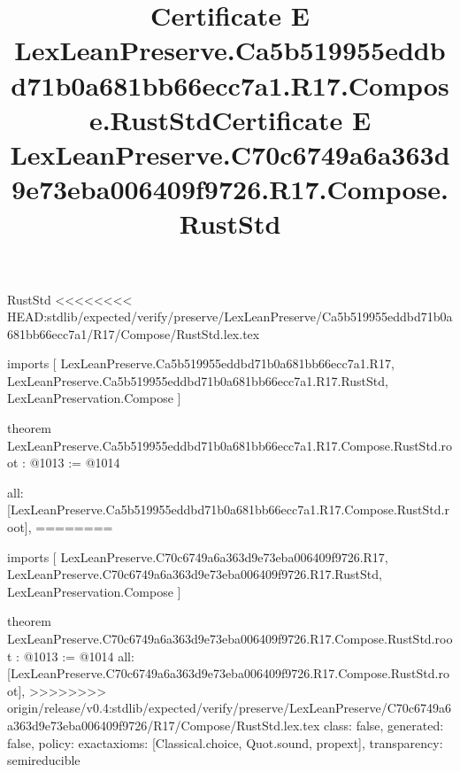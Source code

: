 \begin{lexlean}{RustStd}
<<<<<<<< HEAD:stdlib/expected/verify/preserve/LexLeanPreserve/Ca5b519955eddbd71b0a681bb66ecc7a1/R17/Compose/RustStd.lex.tex
\title{Certificate E LexLeanPreserve.Ca5b519955eddbd71b0a681bb66ecc7a1.R17.Compose.RustStd}
\begin{coremodule}
imports [
  LexLeanPreserve.Ca5b519955eddbd71b0a681bb66ecc7a1.R17,
  LexLeanPreserve.Ca5b519955eddbd71b0a681bb66ecc7a1.R17.RustStd,
  LexLeanPreservation.Compose
]

theorem LexLeanPreserve.Ca5b519955eddbd71b0a681bb66ecc7a1.R17.Compose.RustStd.root : @1013 := @1014 {
  all: [LexLeanPreserve.Ca5b519955eddbd71b0a681bb66ecc7a1.R17.Compose.RustStd.root],
========
\title{Certificate E LexLeanPreserve.C70c6749a6a363d9e73eba006409f9726.R17.Compose.RustStd}
\begin{coremodule}
imports [
  LexLeanPreserve.C70c6749a6a363d9e73eba006409f9726.R17,
  LexLeanPreserve.C70c6749a6a363d9e73eba006409f9726.R17.RustStd,
  LexLeanPreservation.Compose
]

theorem LexLeanPreserve.C70c6749a6a363d9e73eba006409f9726.R17.Compose.RustStd.root : @1013 := @1014 {
  all: [LexLeanPreserve.C70c6749a6a363d9e73eba006409f9726.R17.Compose.RustStd.root],
>>>>>>>> origin/release/v0.4:stdlib/expected/verify/preserve/LexLeanPreserve/C70c6749a6a363d9e73eba006409f9726/R17/Compose/RustStd.lex.tex
  class: false,
  generated: false,
  policy: exact{axioms: [Classical.choice, Quot.sound, propext]},
  transparency: semireducible
}


\end{coremodule}}
\end{coremodule}
\end{lexlean}
